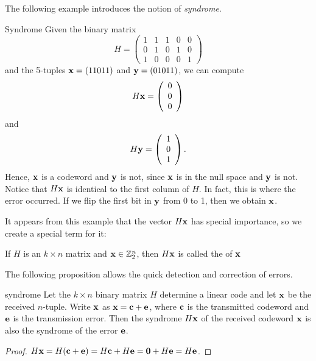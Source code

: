 The following example introduces the notion of \emph{syndrome}.
 
\begin{example}{Syndrome}
Given the binary matrix
\[
H =
\left(
\begin{array}{ccccc}
1 & 1 & 1 & 0 & 0 \\
0 & 1 & 0 & 1 & 0 \\
1 & 0 & 0 & 0 & 1
\end{array}
\right)
\]
and the 5-tuples ${\bold x} = (11011)$ and ${\bold y} =
(01011)$, we can compute
\[
H{\bold x} =
\left(
\begin{array}{c} 0 \\ 0 \\ 0 \end{array}
\right)
\]
and
\[
H{\bold y} =
\left(
\begin{array}{c} 1 \\ 0 \\ 1 \end{array}
\right).
\]
Hence, ${\bold x}$ is a codeword and ${\bold y}$ is not, since
${\bold x}$ is in the null space and ${\bold y}$ is not. Notice that
$H{\bold x}$ is identical to the first column of $H$. In fact, this is
where the error occurred. If we flip the first bit in ${\bold y}$ from
0 to 1, then we obtain ${\bold x}$.  
\end{example}
 
 It appears from this example that the vector $H{\bold x}$ has special importance, so we create a special term for it:
 
 \begin{defn}
If $H$ is an $k \times n$ matrix and ${\bold x} \in \mathbb{Z}_2^n$,
then $H{\bold x}$ is called the  of
${\bold x}$
\end{defn}

\noindent
The following proposition allows
the quick detection and correction of errors.
 
 \begin{prop}{syndrome}
Let the $k \times n$ binary matrix $H$ determine a linear code and let
${\bold x}$ be the received $n$-tuple. Write ${\bold x}$ as ${\bold x}
=  {\bold c} +{\bold e}$, where ${\bold c}$ is the transmitted codeword
and ${\bold e}$ is the transmission error. Then the syndrome  $H{\bold
x}$ of the received codeword ${\bold x}$ is also the syndrome
of the error ${\bold e}$.
\end{prop}
 
 \begin{proof}
$H{\bold x} = H({\bold c} +{\bold e}) = H{\bold c} + H{\bold e} =
{\bold 0} + H{\bold e} = H{\bold e}$.  
\end{proof}
 
